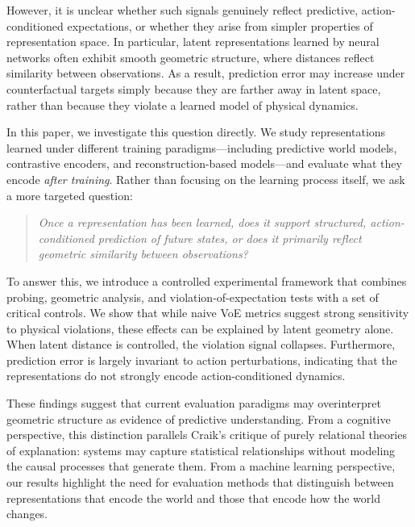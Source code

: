 \documentclass[10pt,twocolumn]{article}
\begin{document}
However, it is unclear whether such signals genuinely reflect predictive, action-conditioned expectations, or whether they arise from simpler properties of representation space. In particular, latent representations learned by neural networks often exhibit smooth geometric structure, where distances reflect similarity between observations. As a result, prediction error may increase under counterfactual targets simply because they are farther away in latent space, rather than because they violate a learned model of physical dynamics.

In this paper, we investigate this question directly. We study representations learned under different training paradigms---including predictive world models, contrastive encoders, and reconstruction-based models---and evaluate what they encode \emph{after training}. Rather than focusing on the learning process itself, we ask a more targeted question:

\begin{quote}
\emph{Once a representation has been learned, does it support structured, action-conditioned prediction of future states, or does it primarily reflect geometric similarity between observations?}
\end{quote}

To answer this, we introduce a controlled experimental framework that combines probing, geometric analysis, and violation-of-expectation tests with a set of critical controls. We show that while naive VoE metrics suggest strong sensitivity to physical violations, these effects can be explained by latent geometry alone. When latent distance is controlled, the violation signal collapses. Furthermore, prediction error is largely invariant to action perturbations, indicating that the representations do not strongly encode action-conditioned dynamics.

These findings suggest that current evaluation paradigms may overinterpret geometric structure as evidence of predictive understanding. From a cognitive perspective, this distinction parallels Craik's critique of purely relational theories of explanation: systems may capture statistical relationships without modeling the causal processes that generate them. From a machine learning perspective, our results highlight the need for evaluation methods that distinguish between representations that encode the world and those that encode how the world changes.
\end{document}
